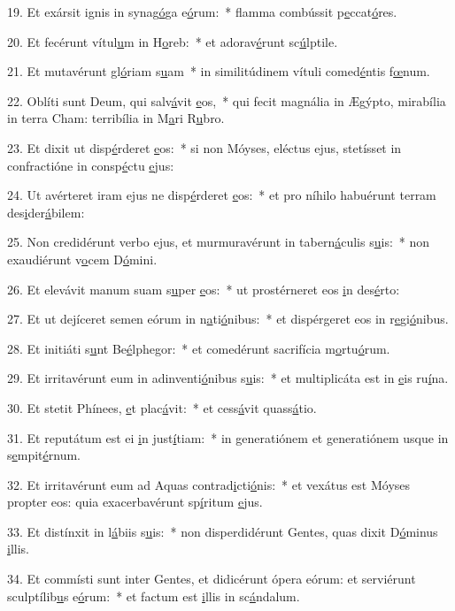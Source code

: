 19. Et exársit ignis in synag\uline{ó}ga e\uline{ó}rum:~* flamma combússit p\uline{e}ccat\uline{ó}res.\par 
20. Et fecérunt vítul\uline{u}m in H\uline{o}reb:~* et adorav\uline{é}runt sc\uline{ú}lptile.\par 
21. Et mutavérunt gl\uline{ó}riam s\uline{u}am~* in similitúdinem vítuli comed\uline{é}ntis f\uline{œ}num.\par 
22. Oblíti sunt Deum, qui salv\uline{á}vit \uline{e}os,~* qui fecit magnália in Ægýpto, mirabília in terra Cham: terribília in M\uline{a}ri R\uline{u}bro.\par 
23. Et dixit ut disp\uline{é}rderet \uline{e}os:~* si non Móyses, eléctus ejus, stetísset in confractióne in consp\uline{é}ctu \uline{e}jus:\par 
24. Ut avérteret iram ejus ne disp\uline{é}rderet \uline{e}os:~* et pro níhilo habuérunt terram des\uline{i}der\uline{á}bilem:\par 
25. Non credidérunt verbo ejus, et murmuravérunt in tabern\uline{á}culis s\uline{u}is:~* non exaudiérunt v\uline{o}cem D\uline{ó}mini.\par 
26. Et elevávit manum suam s\uline{u}per \uline{e}os:~* ut prostérneret eos \uline{i}n des\uline{é}rto:\par 
27. Et ut dejíceret semen eórum in n\uline{a}ti\uline{ó}nibus:~* et dispérgeret eos in r\uline{e}gi\uline{ó}nibus.\par 
28. Et initiáti s\uline{u}nt Be\uline{é}lphegor:~* et comedérunt sacrifícia m\uline{o}rtu\uline{ó}rum.\par 
29. Et irritavérunt eum in adinventi\uline{ó}nibus s\uline{u}is:~* et multiplicáta est in \uline{e}is ru\uline{í}na.\par 
30. Et stetit Phínees, \uline{e}t plac\uline{á}vit:~* et cess\uline{á}vit quass\uline{á}tio.\par 
31. Et reputátum est ei \uline{i}n just\uline{í}tiam:~* in generatiónem et generatiónem usque in s\uline{e}mpit\uline{é}rnum.\par 
32. Et irritavérunt eum ad Aquas contrad\uline{i}cti\uline{ó}nis:~* et vexátus est Móyses propter eos: quia exacerbavérunt sp\uline{í}ritum \uline{e}jus.\par 
33. Et distínxit in l\uline{á}biis s\uline{u}is:~* non disperdidérunt Gentes, quas dixit D\uline{ó}minus \uline{i}llis.\par 
34. Et commísti sunt inter Gentes, et didicérunt ópera eórum: et serviérunt sculptílib\uline{u}s e\uline{ó}rum:~* et factum est \uline{i}llis in sc\uline{á}ndalum.\par 
